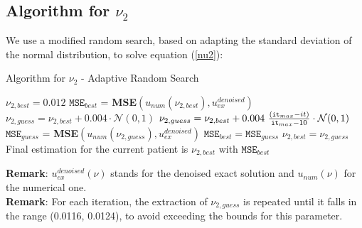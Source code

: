 \documentclass[11pt,a4paper]{article}
\begin{document}
\subsection{Algorithm for $\nu_2$}\label{alg_nu}
We use a modified random search, based on adapting the standard deviation of the normal distribution, to solve equation (\ref{nu2}):
\begin{algorithm}
\caption{Algorithm for $\nu_2$ - Adaptive Random Search}
\begin{algorithmic} 
\State $\nu_{2,best} = 0.012$ 
\vspace{1mm}
\State $\texttt{MSE}_{best}$ = \textbf{MSE}$(u_{num}(\nu_{2,best}), u_{ex}^{denoised})$
\vspace{1mm}
\vspace{1mm}
   \vspace{1mm}
    \State $\nu_{2,guess} = \nu_{2,best}+0.004 \cdot \mathcal{N}(0,1)$ 
    \vspace{1mm}
    \Else
    \vspace{1mm}
    \State $\nu_{2,guess} = \nu_{2,best}+0.004 \ \frac{(\texttt{it}_{max}-it)}{\texttt{\texttt{it}}_{max}-10}  \cdot \mathcal{N}(0,1)$ 
    \vspace{1mm}
\EndIf
\vspace{1mm}
\State $\texttt{MSE}_{guess}$ = \textbf{MSE}$(u_{num}(\nu_{2,guess}), u_{ex}^{denoised})$
\vspace{1mm}
\vspace{1mm}
\State $\texttt{MSE}_{best}=\texttt{MSE}_{guess}$
\vspace{1mm}
\State $\nu_{2,best}=\nu_{2,guess}$
\vspace{1mm}
\EndIf
\vspace{1mm}
\EndWhile
\vspace{1mm}
\State Final estimation for the current patient is $\nu_{2,best}$ with $\texttt{MSE}_{best}$
\vspace{1mm}
\EndFor
\end{algorithmic}
\smaller 
\vspace{0.3cm}
\textbf{Remark}: $u_{ex}^{denoised}(\nu)$ stands for the denoised exact solution and $u_{num}(\nu)$ for the numerical one. \normalsize \\
\smaller \textbf{Remark}: For each iteration, the extraction of $\nu_{2,guess}$ is repeated until it falls in the range (0.0116, 0.0124), to avoid exceeding the bounds for this parameter. \normalsize
\end{algorithm}
\end{document}

